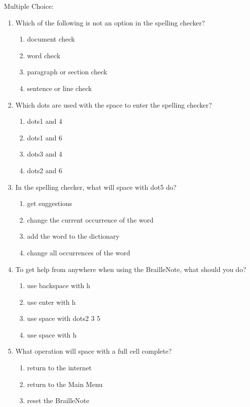 \documentclass[10pt,letterpaper,twoside]{report}
\begin{document}
{{{Multiple Choice:
\begin{enumerate}
	\item Which of the following is not an option in the spelling checker?
	      \begin{enumerate}
		      \item document check
		      \item word check
		      \item paragraph or section check
		      \item sentence or line check
	      \end{enumerate}
	\item Which dots are used with the space to enter the spelling checker?
	      \begin{enumerate}
		      \item dots1 and 4
		      \item dots1 and 6
		      \item dots3 and 4
		      \item dots2 and 6
	      \end{enumerate}
	\item In the spelling checker, what will space with dot5 do?
	      \begin{enumerate}
		      \item get suggestions
		      \item change the current occurrence of the word
		      \item add the word to the dictionary
		      \item change all occurrences of the word
	      \end{enumerate}
	\item To get help from anywhere when using the BrailleNote, what should you do?
	      \begin{enumerate}
		      \item use backspace with h
		      \item use enter with h
		      \item use space with dots2 3 5
		      \item use space with h
	      \end{enumerate}
	\item What operation will space with a full cell complete?
	      \begin{enumerate}
		      \item return to the internet
		      \item return to the Main Menu
		      \item reset the BrailleNote

\end{enumerate}
\end{enumerate}}}}
\end{document}
